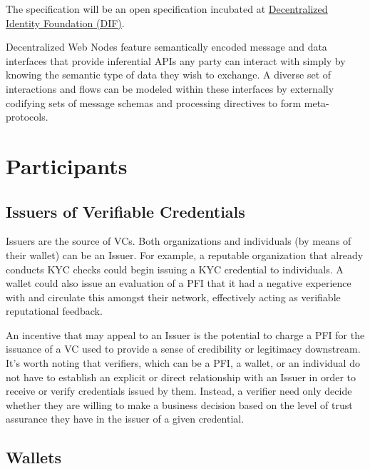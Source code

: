\documentclass[11pt]{article}
\begin{document}
The specification will be an open specification incubated at
\href{https://identity.foundation/decentralized-web-node/spec/}{\uline{\textcolor[HTML]{1155CC}{Decentralized
Identity Foundation (DIF)}}}.

\vspace{1\baselineskip}
Decentralized Web Nodes feature semantically encoded message and data interfaces that provide inferential APIs any party can interact with simply by knowing the semantic type of data they wish to exchange. A diverse set of interactions and flows can be modeled within these interfaces by externally codifying sets of message schemas and processing directives to form meta-protocols.

\section{Participants}

\vspace{1\baselineskip}
\subsection{Issuers of Verifiable Credentials}

\vspace{1\baselineskip}
Issuers are the source of VCs. Both organizations and individuals (by means of their wallet) can be an Issuer. For example, a reputable organization that already conducts KYC checks could begin issuing a KYC credential to individuals. A wallet could also issue an evaluation of a PFI that it had a negative experience with and circulate this amongst their network, effectively acting as verifiable reputational feedback. 

\vspace{1\baselineskip}
An incentive that may appeal to an Issuer is the potential to charge a PFI for the issuance of a VC used to provide a sense of credibility or legitimacy downstream. It’s worth noting that verifiers, which can be a PFI, a wallet, or an individual do not have to establish an explicit or direct relationship with an Issuer in order to receive or verify credentials issued by them. Instead, a verifier need only decide whether they are willing to make a business decision based on the level of trust assurance they have in the issuer of a given credential.

\vspace{1\baselineskip}
\subsection{Wallets}
\end{document}
